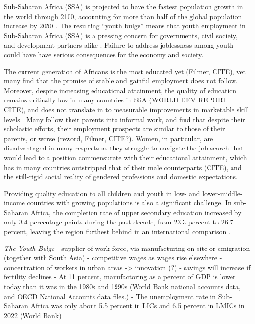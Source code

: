 \documentclass[
  a4paper, twoside, 12pt]{book}
\begin{document}
Sub-Saharan Africa (SSA) is projected to have the fastest population growth in the world through 2100, accounting for more than half of the global population increase by 2050 \autocite{un2022}. The resulting ``youth bulge'' means that youth employment in Sub-Saharan Africa (SSA) is a pressing concern for governments, civil society, and development partners alike \autocite{ilo2022a}. Failure to address joblessness among youth could have have serious consequences for the economy and society.

The current generation of Africans is the most educated yet (Filmer, CITE), yet many find that the promise of stable and gainful employment does not follow. Moreover, despite increasing educational attainment, the quality of education remains critically low in many countries in SSA (WORLD DEV REPORT CITE), and does not translate in to measurable improvements in marketable skill levels \autocite{filmer2020}. Many follow their parents into informal work, and find that despite their scholastic efforts, their employment prospects are similar to those of their parents, or worse (reword, Filmer, CITE?). Women, in particular, are disadvantaged in many respects as they struggle to navigate the job search that would lead to a position commensurate with their educational attainment, which has in many countries outstripped that of their male counterparts (CITE), and the still-rigid social reality of gendered professions and domestic expectations.

Providing quality education to all children and youth in low- and lower-middle-income countries with growing populations is also a significant challenge. In sub-Saharan Africa, the completion rate of upper secondary education increased by only 3.4 percentage points during the past decade, from 23.3 percent to 26.7 percent, leaving the region furthest behind in an international comparison \autocite{un2022}.

\emph{The Youth Bulge}
- supplier of work force, via manufacturing on-site or emigration (together with South Asia)
- competitive wages as wages rise elsewhere
- concentration of workers in urban areas -\textgreater{} innovation (?)
- savings will increase if fertility declines
- At 11 percent, manufactoring as a percent of GDP is lower today than it was in the 1980s and 1990s (World Bank national accounts data, and OECD National Accounts data files.)
- The unemployment rate in Sub-Saharan Africa was only about 5.5 percent in LICs and 6.5 percent in LMICs in 2022 (World Bank)
\end{document}

